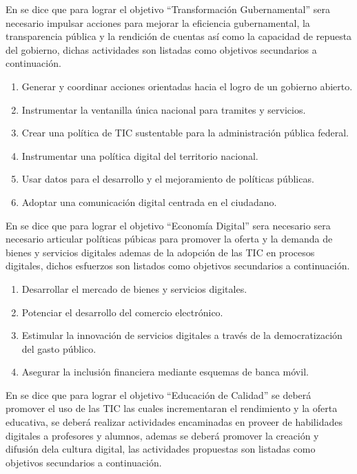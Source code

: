 \documentclass[runningheads,a4paper]{llncs}
\begin{document}
En \cite{EDN_1} se dice que para lograr el objetivo ``Transformación Gubernamental'' sera necesario impulsar acciones para mejorar la eficiencia gubernamental, la transparencia pública y la rendición de cuentas así como la capacidad de repuesta del gobierno, dichas actividades son listadas como objetivos secundarios  a continuación.

\begin{enumerate}
	\item Generar y coordinar acciones orientadas hacia el logro de un gobierno abierto.
	\item Instrumentar la ventanilla única nacional para tramites y servicios.
	\item Crear una política de \gls{TIC} sustentable para la administración pública federal.
	\item Instrumentar una política digital del territorio nacional.
	\item Usar datos para el desarrollo y el mejoramiento de políticas públicas.
	\item Adoptar una comunicación digital centrada en el ciudadano.
\end{enumerate}

En \cite{EDN_1} se dice que para lograr el objetivo ``Economía Digital'' sera necesario sera necesario articular políticas púbicas para promover la oferta y la demanda de bienes y servicios digitales ademas de la adopción de las \gls{TIC} en procesos digitales, dichos esfuerzos son listados como objetivos secundarios a continuación.

\begin{enumerate}
	\item Desarrollar el mercado de bienes y servicios digitales.
	\item Potenciar el desarrollo del comercio electrónico.
	\item Estimular la innovación de servicios digitales a través de la democratización del gasto público.
	\item Asegurar la inclusión financiera mediante esquemas de banca móvil.
\end{enumerate}

En \cite{EDN_1} se dice que para lograr el objetivo ``Educación de Calidad'' se deberá promover el uso de las \gls{TIC} las cuales incrementaran el rendimiento y la oferta educativa, se deberá realizar actividades encaminadas en proveer de habilidades digitales a profesores y alumnos, ademas se deberá promover la creación y difusión dela cultura digital, las actividades propuestas son listadas como objetivos secundarios a continuación.
\end{document}
